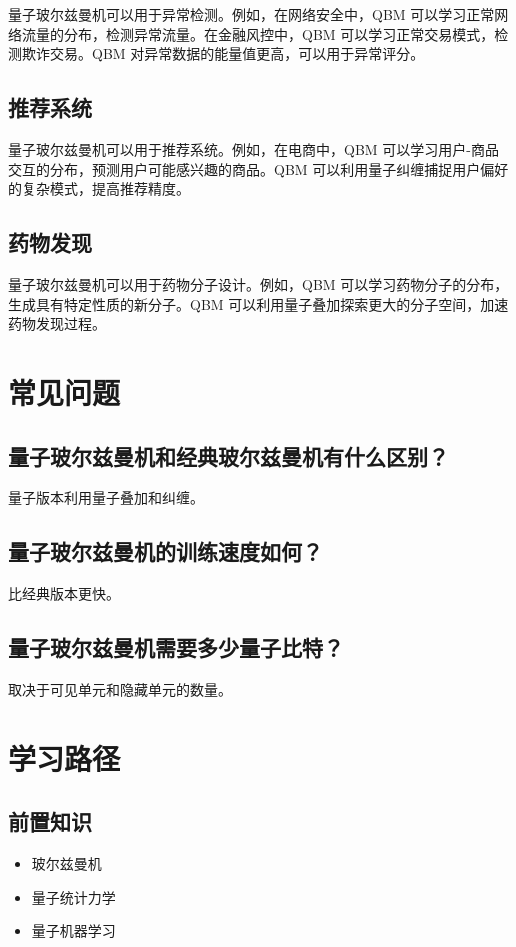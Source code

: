 \documentclass[12pt,a4paper]{article}
\begin{document}
量子玻尔兹曼机可以用于异常检测。例如，在网络安全中，QBM 可以学习正常网络流量的分布，检测异常流量。在金融风控中，QBM 可以学习正常交易模式，检测欺诈交易。QBM 对异常数据的能量值更高，可以用于异常评分。

\subsection{推荐系统}

量子玻尔兹曼机可以用于推荐系统。例如，在电商中，QBM 可以学习用户-商品交互的分布，预测用户可能感兴趣的商品。QBM 可以利用量子纠缠捕捉用户偏好的复杂模式，提高推荐精度。

\subsection{药物发现}

量子玻尔兹曼机可以用于药物分子设计。例如，QBM 可以学习药物分子的分布，生成具有特定性质的新分子。QBM 可以利用量子叠加探索更大的分子空间，加速药物发现过程。

\section{常见问题}

\subsection{量子玻尔兹曼机和经典玻尔兹曼机有什么区别？}

量子版本利用量子叠加和纠缠。

\subsection{量子玻尔兹曼机的训练速度如何？}

比经典版本更快。

\subsection{量子玻尔兹曼机需要多少量子比特？}

取决于可见单元和隐藏单元的数量。

\section{学习路径}

\subsection{前置知识}
\begin{itemize}
  \item 玻尔兹曼机
  \item 量子统计力学
  \item 量子机器学习
\end{itemize}
\end{document}
